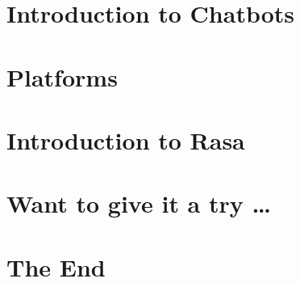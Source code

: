 \section[Intro]{Introduction to Chatbots}


\section[Platforms]{Platforms}


\section[Rasa]{Introduction to Rasa}



% 
% 


% 
% 

% 

% 

% 

\section[Test]{Want to give it a try \ldots}



\section[End]{The End}

